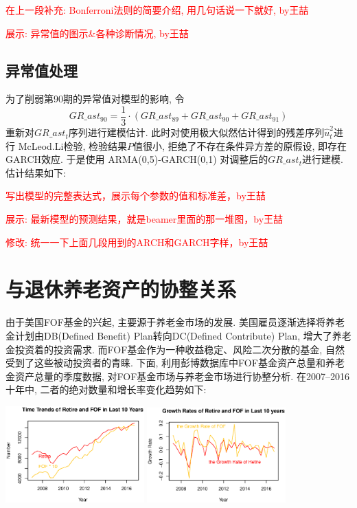 \documentclass[10.5pt,onecolumn,a4paper]{article}%
\begin{document}
\textcolor{red}{在上一段补充: Bonferroni法则的简要介绍, 用几句话说一下就好, by王喆}

\textcolor{red}{展示: 异常值的图示\&各种诊断情况, by王喆}

\subsection{异常值处理}
为了削弱第90期的异常值对模型的影响, 令
$$GR\_ast_{90} = \frac{1}{3} \cdot (GR\_ast_{89}+GR\_ast_{90}+GR\_ast_{91})$$
重新对${GR\_ast_t}$序列进行建模估计.
此时对使用极大似然估计得到的残差序列${\hat{u}_t^2}$进行 McLeod.Li检验, 检验结果$P$值很小, 拒绝了不存在条件异方差的原假设, 即存在GARCH效应. 于是使用 ARMA(0,5)-GARCH(0,1) 对调整后的${GR\_ast_{t}}$进行建模. 估计结果如下:

\textcolor{red}{写出模型的完整表达式，展示每个参数的值和标准差，by王喆}

\textcolor{red}{展示: 最新模型的预测结果，就是beamer里面的那一堆图，by王喆}

\textcolor{red}{修改: 统一一下上面几段用到的ARCH和GARCH字样，by王喆}

\section{与退休养老资产的协整关系}
由于美国FOF基金的兴起, 主要源于养老金市场的发展. 美国雇员逐渐选择将养老金计划由DB(Defined Benefit) Plan转向DC(Defined Contribute) Plan, 增大了养老金投资着的投资需求. 而FOF基金作为一种收益稳定、风险二次分散的基金, 自然受到了这些被动投资者的青睐. 下面, 利用彭博数据库中FOF基金资产总量和养老金资产总量的季度数据, 对FOF基金市场与养老金市场进行协整分析. 在2007--2016十年中, 二者的绝对数量和增长率变化趋势如下:

\includegraphics[width=0.4\textwidth]{pic/3-0-1.eps}
\includegraphics[width=0.4\textwidth]{pic/3-0-2.eps}
\end{document}
